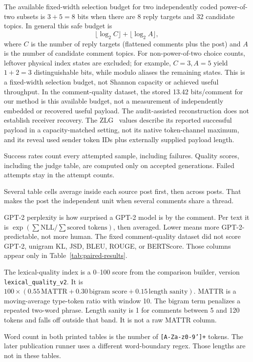 The available fixed-width selection budget for two independently coded power-of-two subsets is $3+5=8$ bits when there are 8 reply targets and 32 candidate topics. In general this safe budget is
\[
\lfloor\log_2 C\rfloor + \lfloor\log_2 A\rfloor,
\]
where $C$ is the number of reply targets (flattened comments plus the post) and $A$ is the number of candidate comment topics.
For non-power-of-two choice counts, leftover physical index states are excluded; for example, $C=3,A=5$ yield $1+2=3$ distinguishable bits, while modulo aliases the remaining states. This is a fixed-width selection budget, not Shannon capacity or achieved useful throughput.
In the comment-quality dataset, the stored 13.42 bits/comment for our method is this available budget, not a measurement of independently embedded or recovered useful payload. The audit-assisted reconstruction does not establish receiver recovery. The ZLG~\cite{lin2024zero} values describe its reported successful payload in a capacity-matched setting, not its native token-channel maximum, and its reveal used sender token IDs plus externally supplied payload length.

Success rates count every attempted sample, including failures.
Quality scores, including the judge table, are computed only on accepted generations.
Failed attempts stay in the attempt counts.

Several table cells average inside each source post first, then across posts.
That makes the post the independent unit when several comments share a thread.

GPT-2 perplexity is how surprised a GPT-2 model is by the comment.
Per text it is $\exp(\sum \mathrm{NLL}/\sum \text{scored tokens})$, then averaged.
Lower means more GPT-2-predictable, not more human.
The fixed comment-quality dataset did not score GPT-2, unigram KL, JSD, BLEU, ROUGE, or BERTScore.
Those columns appear only in Table~\ref{tab:paired-results}.

The lexical-quality index is a 0--100 score from the comparison builder, version \texttt{lexical\_quality\_v2}.
It is $100\times(0.55\,\mathrm{MATTR}+0.30\,\text{bigram score}+0.15\,\text{length sanity})$.
MATTR is a moving-average type-token ratio with window 10.
The bigram term penalizes a repeated two-word phrase.
Length sanity is 1 for comments between 5 and 120 tokens and falls off outside that band.
It is not a raw MATTR column.

Word count in both printed tables is the number of \texttt{[A-Za-z0-9']+} tokens.
The later publication runner uses a different word-boundary regex.
Those lengths are not in these tables.


